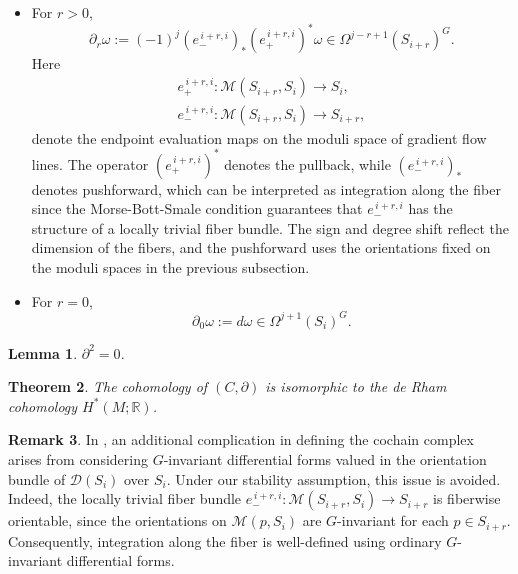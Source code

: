 \documentclass[11pt]{amsart}
\newtheorem{theorem}{Theorem}[section]
\newtheorem{lemma}[theorem]{Lemma}
\theoremstyle{definition}
\newtheorem{remark}[theorem]{Remark}
\numberwithin{equation}{subsection}
\newcommand{\R}{\mathbb{R}}
\newcommand{\p}{\partial}
\newcommand{\des}{\mathscr{D}}
\begin{document}
\begin{itemize}
\item For $r>0$,
\[
\p_r \omega
:= (-1)^j (e_-^{\,i+r,i})_*(e_+^{\,i+r,i})^*\omega
\in \Omega^{j-r+1}(S_{i+r})^G.
\]
Here
\begin{gather*}
    e_+^{\,i+r,i} : \mathcal{M}(S_{i+r},S_i) \to  S_i,\\
   e_-^{\,i+r,i} : \mathcal{M}(S_{i+r},S_i) \to S_{i+r},
\end{gather*}
denote the endpoint evaluation maps on the moduli space of gradient flow lines.  
The operator $(e_+^{\,i+r,i})^*$ denotes the pullback, while $(e_-^{\,i+r,i})_*$ denotes pushforward, which can be interpreted as integration along the fiber since the Morse-Bott-Smale condition guarantees that $e_-^{\,i+r,i}$ has the structure of a locally trivial fiber bundle.  
The sign and degree shift reflect the dimension of the fibers, and the pushforward uses the orientations fixed on the moduli spaces in the previous subsection.

\item For $r=0$,
\[
\p_0 \omega := d\omega \in \Omega^{j+1}(S_i)^G.
\]
\end{itemize}

\begin{lemma}\cite[Proposition 2.3]{zhuang2025analytictopologicalrealizationsinvariant}
$\p^2 = 0$.
\end{lemma}

\begin{theorem}\cite[Theorem 1.4]{zhuang2025analytictopologicalrealizationsinvariant}
The cohomology of $(C,\p)$ is isomorphic to the de Rham cohomology $H^*(M;\R)$.
\end{theorem}

\begin{remark}
 In \cite{zhuang2025analytictopologicalrealizationsinvariant}, an additional 
complication in defining the cochain complex arises from considering $G$-invariant differential forms valued in 
the orientation bundle of $\des(S_i)$ over $S_i$. Under our stability assumption, this issue 
is avoided. Indeed, the locally trivial fiber bundle $
e_-^{\,i+r,i} \colon \mathcal{M}(S_{i+r},S_i) \to S_{i+r}$
is fiberwise orientable, since the orientations on $\mathcal{M}(p,S_i)$ are $G$-invariant for 
each $p\in S_{i+r}$. Consequently, integration along the fiber is well-defined 
using ordinary $G$-invariant differential forms.

\end{remark}
\end{document}
